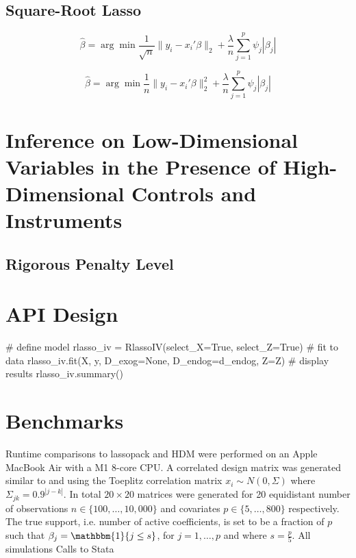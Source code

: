 \documentclass[11pt, reqno]{amsart} \usepackage{pstricks} %
\newcommand{\pkg}[1]{{\fontseries{m}\fontseries{b}\selectfont #1}}
\let\proglang=\textsf
\begin{document}
\subsection{Square-Root Lasso}

\begin{equation}
  \widehat{\beta} = \arg \min \frac{1}{\sqrt{n}} \lVert y_i - x_i'\beta \rVert_2 +
  \frac{\lambda}{n} \sum^p_{j=1}\psi_j|\beta_j|
\end{equation}

\begin{equation}
  \widehat{\beta} = \arg \min \frac{1}{n} \lVert y_i - x_i'\beta \rVert_2^2 +
  \frac{\lambda}{n} \sum^p_{j=1}\psi_j|\beta_j|
\end{equation}

\section{Inference on Low-Dimensional Variables in the Presence 
of High-Dimensional Controls and Instruments}


\subsection{Rigorous Penalty Level}



\section{API Design}

\begin{PythonA}[frame=none]
  # define model
  rlasso_iv = RlassoIV(select_X=True, select_Z=True)
  # fit to data
  rlasso_iv.fit(X, y, D_exog=None, D_endog=d_endog, Z=Z)
  # display results
  rlasso_iv.summary()
\end{PythonA}


\section{Benchmarks}
\label{sec:benchmarks}

Runtime comparisons to \pkg{lassopack} and \pkg{HDM} were performed on an Apple
MacBook Air with a M1 8-core CPU. A correlated design matrix was
generated similar to \cite{Belloni2011} and \cite{Ahrens2020} using the
Toeplitz correlation matrix $x_i \sim N(0,\Sigma)$ where $\Sigma_{jk} =
0.9^{|j-k|}$. In total $20 \times 20$ matrices were generated for 20
equidistant number of observations $n \in \{100, \dots ,10,000\}$ and covariates $p \in
\{5, \dots, 800\}$ respectively. The true support, i.e. number of active
coefficients, is set to be a fraction of $p$ such that $\beta_j =
\mathbbm{1}\{j
\leq s\}$, for $j = 1,\dots,p$ and where $s = \frac{p}{5}$. All simulations Calls to
\proglang{Stata}  
\end{document}
